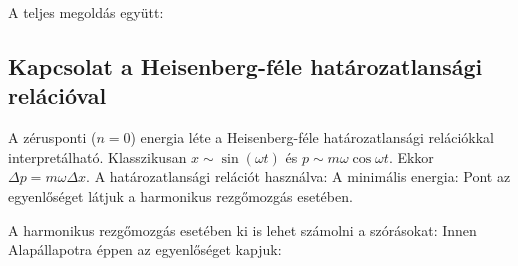     A teljes megoldás együtt:
    \\[6pt]
    
  \subsection{Kapcsolat a Heisenberg-féle határozatlansági relációval}
   
   A zérusponti ($n=0$) energia léte a Heisenberg-féle határozatlansági relációkkal interpretálható.
   Klasszikusan $x\sim\sin(\omega t)$ és $p\sim m\omega\cos\omega t$.
   Ekkor $\Delta p=m\omega \Delta x$.
   A határozatlansági relációt használva:
   A minimális energia:
   Pont az egyenlőséget látjuk a harmonikus rezgőmozgás esetében. 
   
   A harmonikus rezgőmozgás esetében ki is lehet számolni a szórásokat:
   Innen
   Alapállapotra éppen az egyenlőséget kapjuk:
   
